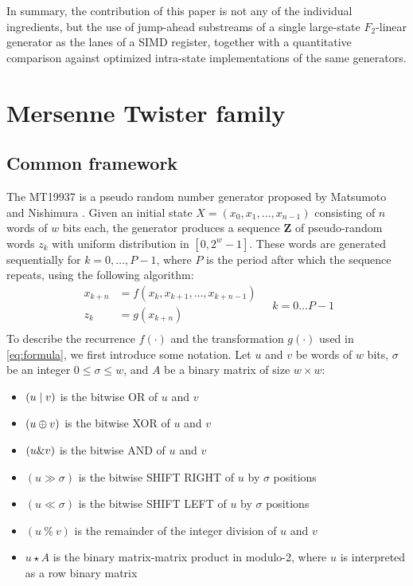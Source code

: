 \documentclass[preprint,1p,times]{elsarticle}
\begin{document}
In summary, the contribution of this paper is not any of the individual ingredients, but the use of jump-ahead substreams of a single large-state $F_2$-linear generator as the lanes of a SIMD register, together with a quantitative comparison against optimized intra-state implementations of the same generators.

\section{Mersenne Twister family}
\label{sec:mt_family}
\subsection{Common framework}
The MT19937 is a pseudo random number generator proposed by Matsumoto and Nishimura \cite{mt19937}.
Given an initial state $X = (x_0, x_1, \dots, x_{n-1})$ consisting of $n$ words of $w$ bits each, the generator produces a sequence $\boldsymbol{Z}$ of pseudo-random words $z_k$ with uniform distribution in $[0, 2^w-1]$. These words are generated sequentially for $k=0, \dots, P-1$, where $P$ is the period after which the sequence repeats, using the following algorithm:
\begin{equation}
\label{eq:formula}
\begin{aligned}
    x_{k+n} &= f(x_{k}, x_{k+1},\dots, x_{k+n-1}) \\
    z_k &= g(x_{k+n}) \\
\end{aligned}
\quad k=0\dots P-1
\end{equation}
To describe the recurrence $f(\cdot)$ and the transformation $g(\cdot)$ used in \eqref{eq:formula}, we first introduce some notation. Let $u$ and $v$ be words of $w$ bits, $\sigma$ be an integer $0\le \sigma \le w$, and $A$ be a binary matrix of size $w \times w$:
\begin{itemize}
    \item $(u \mid v)$ is the bitwise OR of $u$ and $v$
    \item $(u \mathbin{\oplus} v)$ is the bitwise XOR of $u$ and $v$
    \item $(u \& v)$ is the bitwise AND of $u$ and $v$
    \item $(u \gg \sigma)$ is the bitwise SHIFT RIGHT of $u$ by $\sigma$ positions
    \item $(u \ll \sigma)$ is the bitwise SHIFT LEFT of $u$ by $\sigma$ positions
    \item $(u~\%~v)$ is the remainder of the integer division of $u$ and $v$
    \item $u \star A$ is the binary matrix-matrix product in modulo-2, where $u$ is interpreted as a row binary matrix
\end{itemize}
\end{document}
